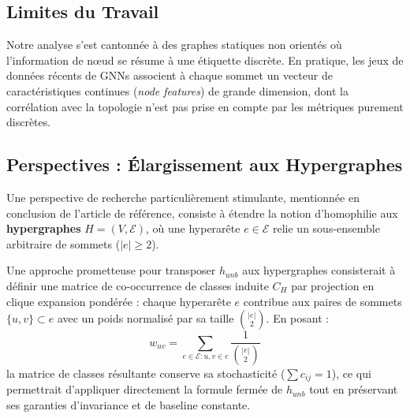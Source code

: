 \documentclass[11pt,a4paper]{article}
\begin{document}
\subsection{Limites du Travail}

Notre analyse s'est cantonnée à des graphes statiques non orientés où l'information de nœud se résume à une étiquette discrète. En pratique, les jeux de données récents de GNNs associent à chaque sommet un vecteur de caractéristiques continues (\textit{node features}) de grande dimension, dont la corrélation avec la topologie n'est pas prise en compte par les métriques purement discrètes.

\subsection{Perspectives : Élargissement aux Hypergraphes}

Une perspective de recherche particulièrement stimulante, mentionnée en conclusion de l'article de référence, consiste à étendre la notion d'homophilie aux \textbf{hypergraphes} $H = (V, \mathcal{E})$, où une hyperarête $e \in \mathcal{E}$ relie un sous-ensemble arbitraire de sommets ($|e| \ge 2$).

Une approche prometteuse pour transposer $h_{unb}$ aux hypergraphes consisterait à définir une matrice de co-occurrence de classes induite $C_H$ par projection en clique expansion pondérée : chaque hyperarête $e$ contribue aux paires de sommets $\{u, v\} \subset e$ avec un poids normalisé par sa taille $\binom{|e|}{2}$. En posant :
\begin{equation}
    w_{uv} = \sum_{e \in \mathcal{E} : u, v \in e} \frac{1}{\binom{|e|}{2}}
\end{equation}
la matrice de classes résultante conserve sa stochasticité ($\sum c_{ij} = 1$), ce qui permettrait d'appliquer directement la formule fermée de $h_{unb}$ tout en préservant ses garanties d'invariance et de baseline constante.
\end{document}
